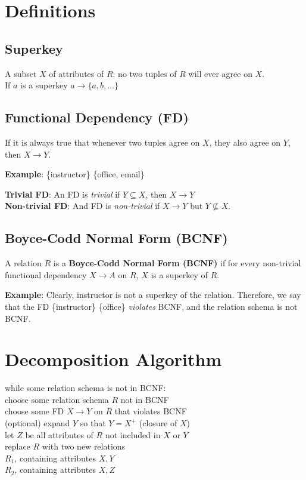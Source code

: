 \documentclass{../cheatsheet}
\begin{document}
\begin{multicols*}{2}
    \section{Definitions}
    \subsection{Superkey}
    A subset $X$ of attributes of $R$: no two tuples of $R$ will ever agree on
    $X$.\\
    If $a$ is a superkey $a \rightarrow \{a, b, \dots\}$

    \subsection{Functional Dependency (FD)}
    If it is always true that whenever two tuples agree on $X$, they also agree
    on $Y$, then $X \rightarrow Y$.

    \textbf{Example}: \{instructor\} \textrightarrow \{office, email\}

    \textbf{Trivial FD}: An FD is \textit{trivial} if $Y \subseteq X$, then $X
    \rightarrow Y$\\
    \textbf{Non-trivial FD}: And FD is \textit{non-trivial} if $X \rightarrow Y$
    but $Y \not\subseteq X$.

    \subsection{Boyce-Codd Normal Form (BCNF)}
    A relation $R$ is a \textbf{Boyce-Codd Normal Form (BCNF)} if for every
    non-trivial functional dependency $X \rightarrow A$ on $R$, $X$ is a superkey of
    $R$.

    \textbf{Example}: Clearly, instructor is not a superkey of the relation.
    Therefore, we say that the FD \{instructor\} \textrightarrow \{office\}
    \textit{violates} BCNF, and the relation schema is not BCNF.

    \section{Decomposition Algorithm}
    while some relation schema is not in BCNF: \\
    \tab choose some relation schema $R$ not in BCNF \\
    \tab choose some FD $X \rightarrow Y$ on $R$ that violates BCNF \\
    \tab (optional) expand $Y$ so that $Y = X^{+}$ (closure of $X$) \\
    \tab let $Z$ be all attributes of $R$ not included in $X$ or $Y$ \\
    \tab replace $R$ with two new relations \\
    \tab\tab $R_1$, containing attributes ${X, Y}$ \\
    \tab\tab $R_2$, containing attributes ${X, Z}$


\end{multicols*}
\end{document}
